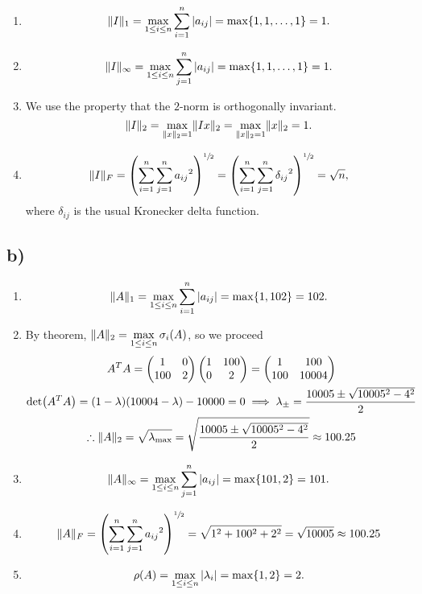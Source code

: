 \documentclass[12pt]{article}
\DeclarePairedDelimiter{\norm}{\lVert}{\rVert}
\theoremstyle{definition}
\theoremstyle{definition}
\theoremstyle{definition}
\theoremstyle{definition}
\theoremstyle{definition}
\theoremstyle{example}
\theoremstyle{note}
\theoremstyle{remark}
\theoremstyle{example}
\begin{document}
				\begin{enumerate}[label=(\roman*)]
					\item $$ \norm{I}_{1} = \max\limits_{1 \le i \le n} \sum_{i=1}^{n}\abs{a_{ij}} = \max \{1,1,\dots ,1\} =1.$$
					\item $$ \norm{I}_{\infty} = \max\limits_{1 \le i \le n}\sum_{j=1}^{n} \abs{a_{ij}} =\max\{1,1,\dots,1\} =1. $$
					\item We use the property that the $2$-norm is orthogonally invariant.
					$$ \norm{I}_{2} = \max\limits_{\norm{x}_{2} =1 } \norm{Ix}_{2} = \max\limits_{\norm{x}_{2}=1} \norm{x}_{2}=1.$$
					\item $$ \norm{I}_{F} = \left(\sum_{i=1}^{n} \sum_{j=1}^{n} {a_{ij}}^{2}\right)^{\sfrac{1}{2}} = \left(\sum_{i=1}^{n} \sum_{j=1}^{n} {\delta_{ij}}^{2}\right)^{\sfrac{1}{2}} = \sqrt{n},$$
					where $\delta_{ij}$ is the usual Kronecker delta function.
				\end{enumerate}
				\subsection*{b) } 
					\begin{enumerate}[label=(\roman*)]
						\item $$ \norm{A}_{1} = \max\limits_{1 \le i \le n} \sum_{i=1}^{n}\abs{a_{ij}} = \max \{1,102\} = 102.$$
						\item By theorem, $\norm{A}_{2} = \max\limits_{1\le i \le n} \sigma_{i}(A)$, so we proceed 
						\begin{gather*}
							A^{T}A = \begin{pmatrix}
							1 & 0 \\ 100 & 2 
							\end{pmatrix}\begin{pmatrix}
							1 & 100 \\ 0 & 2
							\end{pmatrix}
							= \begin{pmatrix}
							1 & 100 \\ 100 & 10004
							\end{pmatrix} \\
							\det(A^{T}A) = (1-\lambda)(10004-\lambda) -10000 =0 \implies \lambda_{\pm} = \frac{10005 \pm \sqrt{10005^{2} -4^{2}}}{2} \\
							\therefore \norm{A}_{2} = \sqrt{\lambda_{\text{max}}} = \sqrt{\frac{10005 \pm \sqrt{10005^{2} -4^{2}}}{2}} \approx 100.25
						\end{gather*}
						\item $$ \norm{A}_{\infty} = \max\limits_{1 \le i \le n} \sum_{j=1}^{n} \abs{a_{ij}} = \max\{101,2\} = 101.$$
						\item $$ \norm{A}_{F} = \left(\sum_{i=1}^{n} \sum_{j=1}^{n} {a_{ij}}^{2}\right)^{\sfrac{1}{2}} = \sqrt{1^{2} + 100^{2} +2^{2}} = \sqrt{10005} \approx 100.25$$
						\item $$ \rho(A) = \max\limits_{1 \le i \le n} \abs{\lambda_{i}} = \max\{1,2\} = 2.$$
					\end{enumerate}
			
\end{document}
